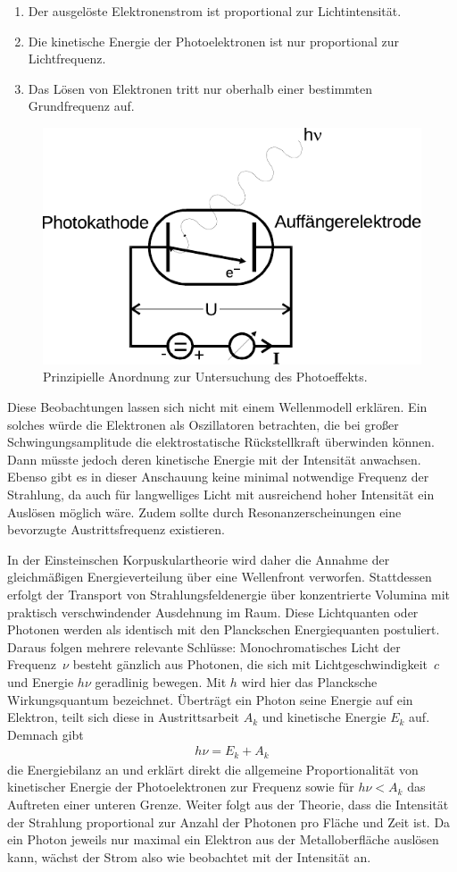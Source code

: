 \begin{enumerate}
	\item Der ausgelöste Elektronenstrom ist proportional zur Lichtintensität.
	\item Die kinetische Energie der Photoelektronen ist nur proportional zur Lichtfrequenz.
	\item Das Lösen von Elektronen tritt nur oberhalb einer bestimmten Grundfrequenz auf.
\end{enumerate}

\begin{figure}[H]
	\centering
	\hspace{4ex}
	\includegraphics[width=0.5\linewidth]{content/grafik/prinzip.pdf}
	\caption{Prinzipielle Anordnung zur Untersuchung des Photoeffekts.}
	\label{fig:prinzip}
\end{figure}

Diese Beobachtungen lassen sich nicht mit einem Wellenmodell erklären. Ein solches würde die Elektronen als Oszillatoren betrachten, die
bei großer Schwingungsamplitude die elektrostatische Rückstellkraft überwinden können. Dann müsste jedoch deren kinetische
Energie mit der Intensität anwachsen. Ebenso gibt es in dieser Anschauung keine minimal notwendige Frequenz der Strahlung, da auch für
langwelliges Licht mit ausreichend hoher Intensität ein Auslösen möglich wäre. Zudem sollte durch Resonanzerscheinungen eine bevorzugte
Austrittsfrequenz existieren. 

In der Einsteinschen Korpuskulartheorie wird daher die Annahme der gleichmäßigen Energieverteilung über eine Wellenfront verworfen.
Stattdessen erfolgt der Transport von Strahlungsfeldenergie über konzentrierte Volumina mit praktisch verschwindender Ausdehnung 
im Raum. Diese Lichtquanten oder Photonen werden als identisch mit den Planckschen Energiequanten postuliert. Daraus folgen mehrere
relevante Schlüsse: Monochromatisches Licht der Frequenz~$\nu$ besteht gänzlich aus Photonen, die sich mit Lichtgeschwindigkeit~$c$
und Energie $h\nu$ geradlinig bewegen. Mit $h$ wird hier das Plancksche Wirkungsquantum bezeichnet. Überträgt ein Photon seine Energie
auf ein Elektron, teilt sich diese in Austrittsarbeit $A_k$ und kinetische Energie $E_k$ auf. Demnach gibt
\begin{align}
	h\nu = E_k + A_k
	\label{eqn:bilanz}
\end{align}
die Energiebilanz an und erklärt direkt die allgemeine Proportionalität von kinetischer Energie der Photoelektronen zur Frequenz sowie
für $h\nu < A_k$ das Auftreten einer unteren Grenze. Weiter folgt aus der Theorie, dass die Intensität der Strahlung proportional
zur Anzahl der Photonen pro Fläche und Zeit ist. Da ein Photon jeweils nur maximal ein Elektron aus der Metalloberfläche auslösen kann,
wächst der Strom also wie beobachtet mit der Intensität an.
\\[5em]
